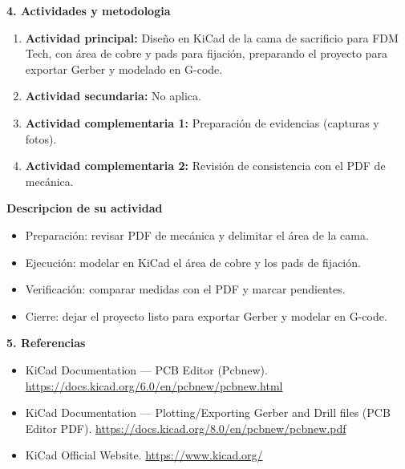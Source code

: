 \documentclass[11pt,a4paper]{article}
\newcommand{\ActividadPrincipal}{Dise\~no en KiCad de la cama de sacrificio para FDM Tech, con \'area de cobre y pads para fijaci\'on, preparando el proyecto para exportar Gerber y modelado en G-code}
\newcommand{\ActividadSecundaria}{No aplica}
\newcommand{\SectionTitle}[1]{%
  \vspace{1mm}
  {\Large\bfseries\color{CNCblue}#1}\par
  \vspace{1mm}
}
\newcommand{\SubTitle}[1]{%
  {\bfseries\color{CNCdark}#1}\par
}
\newcommand{\SafeItem}{\Needspace{3\baselineskip}\item}
\newcommand{\SafeURL}{\url}
\begin{document}
\SectionTitle{4. Actividades y metodologia}
\begin{tcolorbox}[title=\textbf{\color{CNCblue}Actividades}]
\begin{enumerate}[leftmargin=*,itemsep=2pt]
  \SafeItem \textbf{Actividad principal:} \ActividadPrincipal.
  \SafeItem \textbf{Actividad secundaria:} \ActividadSecundaria.
  \SafeItem \textbf{Actividad complementaria 1:} Preparaci\'on de evidencias (capturas y fotos).
  \SafeItem \textbf{Actividad complementaria 2:} Revisi\'on de consistencia con el PDF de mec\'anica.
\end{enumerate}
\end{tcolorbox}

\begin{tcolorbox}[title=\textbf{\color{CNCblue}Metodologia}]
\SubTitle{Descripcion de su actividad}
\begin{itemize}[leftmargin=*,itemsep=2pt]
  \SafeItem Preparaci\'on: revisar PDF de mec\'anica y delimitar el \'area de la cama.
  \SafeItem Ejecuci\'on: modelar en KiCad el \'area de cobre y los pads de fijaci\'on.
  \SafeItem Verificaci\'on: comparar medidas con el PDF y marcar pendientes.
  \SafeItem Cierre: dejar el proyecto listo para exportar Gerber y modelar en G-code.
\end{itemize}
\end{tcolorbox}

\SectionTitle{5. Referencias}
\begin{tcolorbox}[title=\textbf{\color{CNCblue}Fuentes consultadas}]
\begin{itemize}[leftmargin=*,itemsep=2pt]
  \SafeItem KiCad Documentation — PCB Editor (Pcbnew). \SafeURL{https://docs.kicad.org/6.0/en/pcbnew/pcbnew.html}
  \SafeItem KiCad Documentation — Plotting/Exporting Gerber and Drill files (PCB Editor PDF). \SafeURL{https://docs.kicad.org/8.0/en/pcbnew/pcbnew.pdf}
  \SafeItem KiCad Official Website. \SafeURL{https://www.kicad.org/}
\end{itemize}
\end{tcolorbox}
\end{document}
